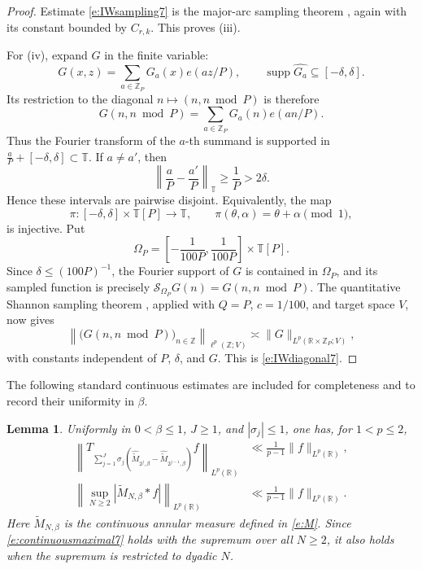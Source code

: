 \documentclass[12pt,reqno]{amsart}
\numberwithin{equation}{section}
\newtheorem{lemma}[equation]{Lemma}
\theoremstyle{definition}
\theoremstyle{remark}
\begin{document}
\begin{proof}
Estimate \eqref{e:IWsampling7} is the major-arc sampling theorem
\cite[Theorem~1.6]{Tao2021}, again with its constant bounded by
\( C_{r,k}\).  This proves \textup{(iii)}.

For \textup{(iv)}, expand \(G\) in the finite variable:
\[
 G(x,z)
 =
 \sum_{a\in\mathbb Z_P}G_a(x)e(az/P),
 \qquad
 \operatorname{supp}\widehat{G_a}
 \subseteq[-\delta,\delta].
\]
Its restriction to the diagonal \(n\mapsto(n,n\bmod P)\) is therefore
\[
 G(n,n\bmod P)
 =
 \sum_{a\in\mathbb Z_P}G_a(n)e(an/P).
\]
Thus the Fourier transform of the \(a\)-th summand is supported in $\frac aP+[-\delta,\delta]\subset\mathbb T.$
If \(a\neq a'\), then
\[
 \left\|\frac aP-\frac{a'}P\right\|_{\mathbb T}
 \geq\frac1P>2\delta.
\]
Hence these intervals are pairwise disjoint.  Equivalently, the map
\[
 \pi:
 [-\delta,\delta]\times\mathbb T[P]\longrightarrow\mathbb T,
 \qquad
 \pi(\theta,\alpha)=\theta+\alpha\pmod1,
\]
is injective.
Put
\[
 \Omega_P=
 \left[-\frac1{100P},\frac1{100P}\right]
 \times\mathbb T[P].
\]
Since \(\delta\leq(100P)^{-1}\), the Fourier support of \(G\) is
contained in \(\Omega_P\), and its sampled function is precisely $\mathcal S_{\Omega_P}G(n)=G(n,n\bmod P).$
The quantitative Shannon sampling theorem
\cite[Proposition~1.5]{Tao2021}, applied with \(Q=P\),
\(c=1/100\), and target space \(V\), now gives
\[
 \left\|
 \bigl(G(n,n\bmod P)\bigr)_{n\in\mathbb Z}
 \right\|_{\ell^p(\mathbb Z;V)}
 \asymp
 \|G\|_{L^p(\mathbb R\times\mathbb Z_P;V)},
\]
with constants independent of \(P\), \(\delta\), and \(G\).  This is
\eqref{e:IWdiagonal7}.
\end{proof}

The following standard continuous estimates are included for
completeness and to record their uniformity in \(\beta\).

\begin{lemma}\label{l:continuousestimates7}
Uniformly in \(0<\beta\leq1\), \(J\geq1\), and
\(|\sigma_j|\leq1\), one has, for \(1<p\leq2\),
\begin{align}
 \left\|
 T_{\sum_{j=1}^J\sigma_j
   (\widehat{\widetilde M}_{2^j,\beta}
    -\widehat{\widetilde M}_{2^{j-1},\beta})}f
 \right\|_{L^p(\mathbb R)}
 &\ll
 \frac1{p-1}\|f\|_{L^p(\mathbb R)},
 \label{e:continuousincrements7}\\
 \left\|
 \sup_{N\geq2}
 |\widetilde M_{N,\beta}*f|
 \right\|_{L^p(\mathbb R)}
 &\ll
 \frac1{p-1}\|f\|_{L^p(\mathbb R)}.
 \label{e:continuousmaximal7}
\end{align}
Here \(\widetilde M_{N,\beta}\) is the continuous annular measure
defined in \eqref{e:M}.  Since \eqref{e:continuousmaximal7} holds with
the supremum over all \(N\geq2\), it also holds when the supremum is
restricted to dyadic \(N\).
\end{lemma}
\end{document}
